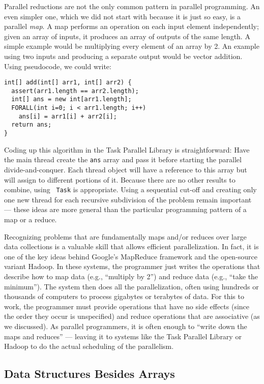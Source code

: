 \documentclass[10pt]{article}
\begin{document}
Parallel reductions are not the only common pattern in parallel
programming.  An even simpler one, which we did not start with because
it is just so easy, is a parallel \emph{map}.  A map performs an
operation on each input element independently; given an array of inputs,
it produces an array of outputs of the same length.  A simple example
would be multiplying every element of an array by 2.  An example using
two inputs and producing a separate output would be vector addition.
Using pseudocode, we could write:
\begin{verbatim}
int[] add(int[] arr1, int[] arr2) {
  assert(arr1.length == arr2.length);
  int[] ans = new int[arr1.length];
  FORALL(int i=0; i < arr1.length; i++)
    ans[i] = arr1[i] + arr2[i];
  return ans;
}
\end{verbatim}
Coding up this algorithm in the Task Parallel Library is straightforward:
Have the main thread create the {\tt ans} array and pass it before starting the
parallel divide-and-conquer.  Each thread object will have a reference
to this array but will assign to different portions of it.  Because
there are no other results to combine, using {\tt
  Task} is appropriate.  Using a sequential cut-off and
creating only one new thread for each recursive subdivision of the
problem remain important --- these ideas are more general than the
particular programming pattern of a map or a reduce.

Recognizing problems that are fundamentally maps and/or reduces over
large data collections is a valuable skill that allows efficient
parallelization.  In fact, it is one of the key ideas behind Google's
MapReduce framework and the open-source variant Hadoop.  In these
systems, the programmer just writes the operations that describe how
to map data (e.g., ``multiply by 2'') and reduce data (e.g., ``take
the minimum'').  The system then does all the parallelization, often
using hundreds or thousands of computers to process gigabytes or
terabytes of data.  For this to work, the programmer must provide
operations that have no side effects (since the order they occur
is unspecified) and reduce operations that are associative (as we
discussed).  As parallel programmers, it is often enough to ``write
down the maps and reduces'' --- leaving it to systems like the
Task Parallel Library or Hadoop to do the actual scheduling of the
parallelism.

\subsection{Data Structures Besides Arrays}
\label{sec:beyond-arrays}
\end{document}
